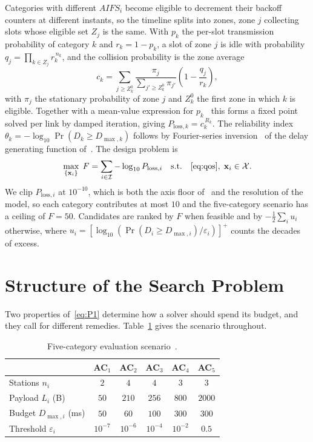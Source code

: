 \documentclass[journal,a4paper,comsoc,twocolumn]{IEEEtran}
\newcommand{\Ploss}[1][]{P_{\mathrm{loss}#1}}
\begin{document}
Categories with different $AIFS_i$ become eligible to decrement their backoff
counters at different instants, so the timeline splits into zones, zone $j$
collecting slots whose eligible set $Z_j$ is the same. With $p_k$ the per-slot
transmission probability of category $k$ and $r_k = 1-p_k$, a slot of zone $j$
is idle with probability $q_j = \prod_{k \in Z_j} r_k^{\,n_k}$, and the
collision probability is the zone average
\begin{equation}
\label{eq:ck}
c_k = \sum_{j \ge Z_k^0} \frac{\pi_j}{\sum_{j' \ge Z_k^0}\pi_{j'}}
      \left(1 - \frac{q_j}{r_k}\right),
\end{equation}
with $\pi_j$ the stationary probability of zone $j$ and $Z_k^0$ the first zone
in which $k$ is eligible. Together with a mean-value expression for
$p_k$~\cite{Bianchi2000} this forms a fixed point solved per link by damped
iteration, giving $\Ploss[,k] = c_k^{\,R_k}$. The reliability index
$\theta_k = -\log_{10}\Pr(D_k \ge D_{\max,k})$ follows by Fourier-series
inversion~\cite{AbateWhitt1992} of the delay generating function
of~\cite[Eqs.~(10)--(15)]{Yi2025}. The design problem is
\begin{equation}
\label{eq:P1}
\max_{\{\mathbf{x}_i\}} \; F = \sum_{i\in\mathcal{I}} -\log_{10} \Ploss[,i]
\quad \text{s.t.} \quad \eqref{eq:qos},\; \mathbf{x}_i \in \mathcal{X} .
\end{equation}
We clip $\Ploss[,i]$ at $10^{-10}$, which is both the axis floor
of~\cite{Yi2025} and the resolution of the model, so each category contributes
at most $10$ and the five-category scenario has a ceiling of $F = 50$.
Candidates are ranked by $F$ when feasible and by
$-\tfrac{1}{2}\sum_i u_i$ otherwise, where
$u_i = [\log_{10}(\Pr(D_i \ge D_{\max,i})/\varepsilon_i)]^{+}$ counts the
decades of excess.

\section{Structure of the Search Problem}
\label{sec:hard}

Two properties of~\eqref{eq:P1} determine how a solver should spend its budget,
and they call for different remedies. Table~\ref{tab:scenario} gives the
scenario throughout.

\begin{table}[!t]
\centering
\caption{Five-category evaluation scenario~\cite[Sec.~V]{Yi2025}.}
\label{tab:scenario}
\small
\setlength{\tabcolsep}{4pt}
\begin{tabular}{lccccc}
\toprule
 & AC$_1$ & AC$_2$ & AC$_3$ & AC$_4$ & AC$_5$ \\
\midrule
Stations $n_i$            & $2$ & $4$ & $4$ & $3$ & $3$ \\
Payload $L_i$ (B)         & $50$ & $210$ & $256$ & $800$ & $2000$ \\
Budget $D_{\max,i}$ (ms)  & $50$ & $60$ & $100$ & $300$ & $300$ \\
Threshold $\varepsilon_i$ & $10^{-7}$ & $10^{-6}$ & $10^{-4}$ & $10^{-2}$ & $0.5$ \\
\bottomrule
\end{tabular}
\end{table}
\end{document}
